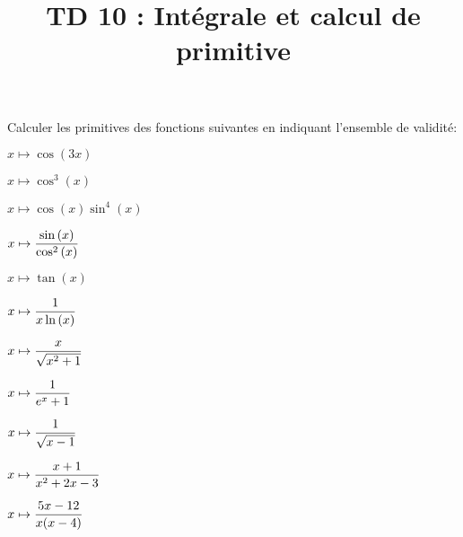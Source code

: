 \documentclass[a4paper, 11pt,reqno]{article}
\begin{document}
\title{TD 10 :  Intégrale et calcul de primitive}

\begin{exercice}  \;
	Calculer les primitives des fonctions suivantes en indiquant l'ensemble de validit\'e:
	\begin{enumerate}
		\begin{minipage}[t]{0.3\textwidth}
			\item $x\mapsto \cos{(3x)}$
			\item $x\mapsto \cos^3{(x)}$
			\item $x\mapsto \cos{(x)}\sin^4{(x)}$
			\item $x\mapsto \displaystyle\frac{\sin{(x)}}{\cos^2{(x)}}$
			\item $x\mapsto \tan{(x)}$
		\end{minipage}
		\begin{minipage}[t]{0.3\textwidth}
			\item $x\mapsto \displaystyle\frac{1}{ x\ln{(x)}}$
			\item $x\mapsto \displaystyle\frac{x}{\sqrt{x^2+1}}$
			\item $x\mapsto \displaystyle\frac{1}{e^x+1}$
		\end{minipage}
		\begin{minipage}[t]{0.3\textwidth}
			\item $x\mapsto \displaystyle\frac{1}{ \sqrt{x-1} }$
			\item $x\mapsto \displaystyle\frac{x+1}{x^2+2x-3}$
			\item $x\mapsto \displaystyle\frac{5x-12}{x(x-4)}$
		\end{minipage}
	\end{enumerate}
\end{exercice}
\end{document}
